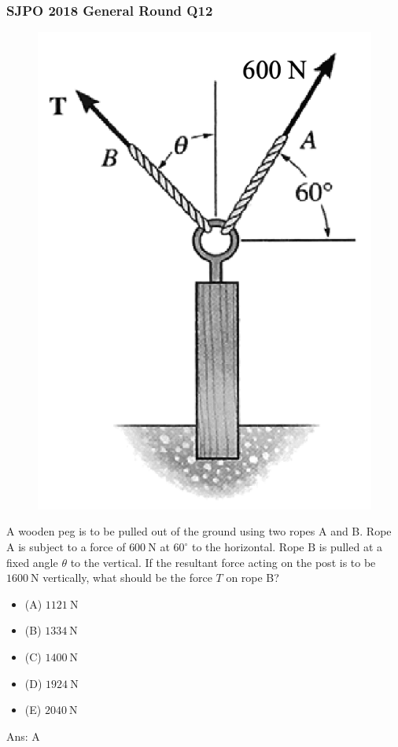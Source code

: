 \documentclass{article}
\begin{document}
\subsubsection{SJPO 2018 General Round Q12}
\label{sec:sjpo2018q12sec_static}
{
\begin{figure}
\includegraphics[width=1.0\linewidth]{images/sjpo2018q12.png}
\end{figure}
A wooden peg is to be pulled out of the ground using two ropes A and B. Rope $\mathrm{A}$ is subject to a force of $600 \mathrm{~N}$ at $60^{\circ}$ to the horizontal. Rope $\mathrm{B}$ is pulled at a fixed angle $\theta$ to the vertical. If the resultant force acting on the post is to be $1600 \mathrm{~N}$ vertically, what should be the force $T$ on rope B?
\begin{itemize}
\item[] (A) $1121 \mathrm{~N}$
\item[] (B) $1334 \mathrm{~N}$
\item[] (C) $1400 \mathrm{~N}$
\item[] (D) $1924 \mathrm{~N}$
\item[] (E) $2040 \mathrm{~N}$
\end{itemize}
Ans: \ifpaper A \fi
}
\end{document}
